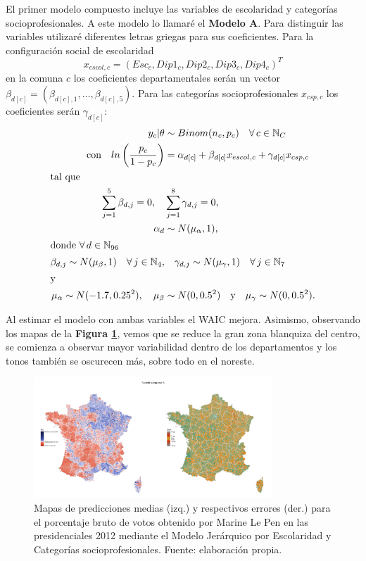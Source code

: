 El primer modelo compuesto incluye las variables de escolaridad y categorías socioprofesionales. A este modelo lo llamaré el \textbf{Modelo A}. Para distinguir las variables utilizaré diferentes letras griegas para sus coeficientes. Para la configuración social de escolaridad 
\[x_{escol,c} = (Esc_c,Dip1_c,Dip2_c,Dip3_c,Dip4_c)^T\]
en la comuna $c$ los coeficientes departamentales serán un vector $\beta_{d[c]} = (\beta_{d[c],1},\dots,\beta_{d[c],5})$. Para las categorías socioprofesionales $x_{csp,c}$ los coeficientes serán $\gamma_{d[c]}$:
\begin{align}\label{eq:Modelo_Comp_A}
y_c|\theta & \sim Binom(n_c,p_c) \quad \forall \, c \in \mathbb{N}_C \nonumber \\
\text{con} \quad ln\left(\dfrac{p_c}{1-p_c}\right) &= \alpha_{d[c]} + \beta_{d[c]} x_{escol,c} + \gamma_{d[c]} x_{csp,c} \\ 
\intertext{tal que} 
\sum\limits_{j = 1}^{5} \beta_{d,j}=0, \quad & \sum\limits_{j = 1}^{8} \gamma_{d,j}=0, \nonumber \\
\alpha_d & \sim N(\mu_{\alpha}, 1), \nonumber \\
\intertext{donde $\forall \, d \in \mathbb{N}_{96}$}
\beta_{d,j} \sim N(\mu_{\beta}, 1) \quad \forall \, j \in \mathbb{N}_{4}, & \quad \gamma_{d,j} \sim N(\mu_{\gamma}, 1) \quad \forall \, j \in \mathbb{N}_{7} \nonumber \\
\intertext{y}
\mu_{\alpha} \sim N(-1.7, 0.25^2), \quad \mu_{\beta} &\sim N(0, 0.5^2) \quad \text{y} \quad \mu_{\gamma} \sim N(0,0.5^2). \nonumber
\end{align}

Al estimar el modelo con ambas variables el WAIC mejora. Asimismo, observando los mapas de la \textbf{Figura \ref{fig:Modelo_Compuesto_A}}, vemos que se reduce la gran zona blanquiza del centro, se comienza a observar mayor variabilidad dentro de los departamentos y los tonos también se oscurecen más, sobre todo en el noreste.\\ 

\begin{figure}[h]
	\centering
	\includegraphics[width = 0.8\textwidth]{Figs/Modelado/Modelo_Compuesto_A}
	\caption{Mapas de predicciones medias (izq.) y respectivos errores (der.) para el porcentaje bruto de votos obtenido por Marine Le Pen en las presidenciales 2012 mediante el Modelo Jerárquico por Escolaridad y Categorías socioprofesionales. Fuente: elaboración propia.}
	\label{fig:Modelo_Compuesto_A}
\end{figure}

